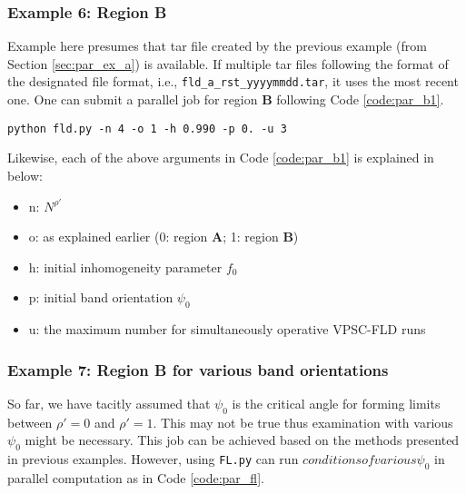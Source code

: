 \documentclass[12pt]{amsart}
\begin{document}
\subsubsection{Example 6: Region \textbf{B}}
\label{sec:par_ex_b}
Example here presumes that tar file created by the previous example (from Section \ref{sec:par_ex_a}) is available.
If multiple tar files following the format of the designated file format, i.e., \verb$fld_a_rst_yyyymmdd.tar$, it uses the most recent one.
One can submit a parallel job for region \textbf{B} following Code \ref{code:par_b1}.
\begin{lstlisting}[style=sh, caption=An example command for parallel run for region \textbf{B} simulations, label={code:par_b1}]
python fld.py -n 4 -o 1 -h 0.990 -p 0. -u 3
\end{lstlisting}
Likewise, each of the above arguments in Code \ref{code:par_b1} is explained in below:
\begin{itemize}
\item n: $N^{\rho'}$
\item o: as explained earlier (0: region \textbf{A}; 1: region \textbf{B})
\item h: initial inhomogeneity parameter $f_0$
\item p: initial band orientation $\psi_0$
\item u: the maximum number for simultaneously operative VPSC-FLD runs
\end{itemize}

\subsubsection{Example 7: Region \textbf{B} for various band orientations}
\label{sec:par_b_psi}
So far, we have tacitly assumed that $\psi_0$ is the critical angle for forming limits between $\rho'=0$ and $\rho'=1$.
This may not be true thus examination with various $\psi_0$ might be necessary.
This job can be achieved based on the methods presented in previous examples.
However, using \verb$FL.py$ can run $conditions of various \psi_0$ in parallel computation as in Code \ref{code:par_fl}.
\end{document}
